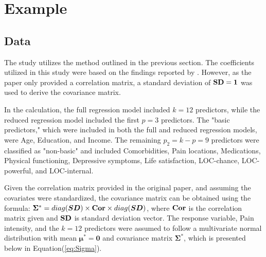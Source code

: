 \chapter{Example}

\section{Data}
The study utilizes the method outlined in the previous section. The coefficients utilized in this study were based on the findings reported by \cite{baker2008chronicpain}. However, as the paper only provided a correlation matrix, a standard deviation of $\bm{\mathrm{SD}} = \bm1$ was used to derive the covariance matrix.

In the calculation, the full regression model included $k = 12$ predictors, while the reduced regression model included the first $p = 3$ predictors. The "basic predictors," which were included in both the full and reduced regression models, were Age, Education, and Income. The remaining $p_2 = k-p = 9$ predictors were classified as "non-basic" and included Comorbidities, Pain locations, Medications, Physical functioning, Depressive symptoms, Life satisfaction, LOC-chance, LOC-powerful, and LOC-internal.

Given the correlation matrix provided in the original paper, and assuming the covariates were standardized, the covariance matrix can be obtained using the formula: $\bm\Sigma^* = diag(\bm {SD}) \times \bm{\mathrm{Cor}} \times diag(\bm {SD})$, where $\bm{\mathrm{Cor}}$ is the correlation matrix given and $\bm{\mathrm{SD}}$ is standard deviation vector. The response variable, Pain intensity, and the $k = 12$ predictors were assumed to follow a multivariate normal distribution with mean $\bm{\mu}^* = \boldsymbol{0}$ and covariance matrix $\bm{\Sigma^*}$, which is presented below in Equation(\ref{eq:Sigma}).

